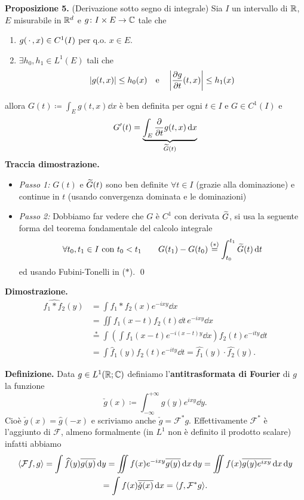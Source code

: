 \textbf{Proposizione 5.} (Derivazione sotto segno di integrale)
Sia $I$ un intervallo di $\mathbb R$, $E$ misurabile in $\mathbb R^d$ e $g \colon I \times E \to \mathbb C$ tale che
\begin{enumerate}
	\item $g(\,\cdot\,, x) \in C^1(I)$ per q.o. $x \in E$.
	\item $\exists h_0, h_1 \in L^1(E)$ tali che
		$$
		|g(t, x)| \leq h_0(x) 
		\quad
		\text{e}
		\quad
		\left|\frac{\partial g}{\partial t}(t, x)\right| \leq h_1(x)
		$$
\end{enumerate}
allora $G(t) \coloneqq \int_E g(t, x) \dd x$ è ben definita per ogni $t \in I$ e $G \in C^1(I)$ e
$$
G'(t) = \underbrace{\int_E \frac{\partial}{\partial t}g(t, x) \,\mathrm{d} x}_{\widetilde{G}(t)}
$$
\textbf{Traccia dimostrazione.}
\begin{itemize}
	\item \textit{Passo 1:} $G(t)$ e $\widetilde G(t)$ sono ben definite $\forall t \in I$ (grazie alla dominazione) e continue in $t$ (usando convergenza dominata e le dominazioni)
	\item \textit{Passo 2:} Dobbiamo far vedere che $G$ è $C^1$ con derivata $\widetilde G$, si usa la seguente forma del teorema fondamentale del calcolo integrale
		$$
		\forall t_0, t_1 \in I \text{ con } t_0 < t_1
		\qquad
		G(t_1) - G(t_0) \overset{(*)}{=} \int_{t_0}^{t_1} \widetilde G(t) \,\mathrm{d} t
		$$
		ed usando Fubini-Tonelli in ($*$).
\qed
\end{itemize}


\textbf{Dimostrazione.}
$$
\begin{aligned}
	\hat{f_1 \ast f_2}(y)
	& = \int f_1 \ast f_2 (x) e^{-ixy} \dd x \\
	& = \iint f_1(x - t) f_2(t) \dd t \, e^{-ixy} \dd x \\
	& \overset{\ast}{=} \int \left(\int f_1(x - t) e^{-i(x - t)y} \dd x \right) f_2(t) e^{-ity} \dd t \\
	& = \int \hat f_1(y) f_2(t) e^{-ity} \dd t = \hat{f_1}(y) \cdot \hat{f_2}(y).
\end{aligned}
$$

\textbf{Definizione.}
Data $g \in L^1(\mathbb R; \mathbb C)$ definiamo l'\textbf{antitrasformata di Fourier} di $g$ la funzione
$$
	\check g(x) \coloneqq \int_{-\infty}^{+\infty} g(y) e^{ixy} \dd y.
$$
Cioè $\check g(x) = \hat g(-x)$ e scriviamo anche $\check g = \mathcal F^* g$. Effettivamente $\mathcal F^*$ è l'aggiunto di $\mathcal F$, almeno formalmente (in $L^1$ non è definito il prodotto scalare) infatti abbiamo
\begin{multline*}
	\langle \mathcal F f, g \rangle
	= \int \widehat{f}(y) \overline{g(y)} \,\mathrm{d} y
	= \iint f(x) e^{-ixy} \overline{g(y)} \,\mathrm{d} x \,\mathrm{d} y
	= \iint f(x) \overline{g(y)e^{ixy}} \,\mathrm{d} x \,\mathrm{d} y \\
	= \int f(x) \overline{\check g(x)} \,\mathrm{d} x
	= \langle f, \mathcal F^* g \rangle.
\end{multline*}


